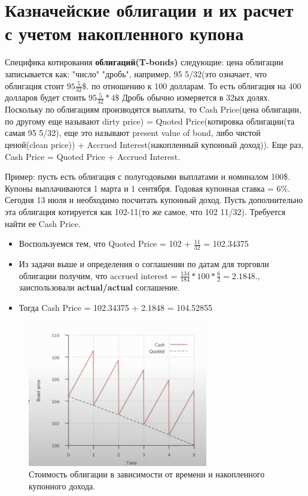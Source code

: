 \documentclass{article}
\begin{document}
\section{Казначейские облигации и их расчет с учетом накопленного купона}
Специфика котирования \textbf{облигаций(T-bonds)} следующие: цена облигации записывается как: "число" "дробь", например, 95 5/32(это означает, что облигация стоит $95\frac{5}{32}\$.$ по отношению к 100 долларам. То есть облигация на 400 долларов будет стоить $95\frac{5}{32}*4 \$$ Дробь обычно измеряется в 32ых долях.
Поскольку по облигациям производятся выплаты, то Cash Price(цена облигации, по другому еще называют dirty price) = Quoted Price(котировка облигации(та самая 95 5/32), еще это называют present value of bond, либо чистой ценой(clean price)) + Accrued Interest(накопленный купонный доход)).
Еще раз, Cash Price = Quoted Price + Accrued Interest.


Пример:  пусть есть облигация с полугодовыми выплатами и номиналом 100\$. Купоны выплачиваются 1 марта и 1 сентября. Годовая купонная ставка = 6\%. Сегодня 13 июля и необходимо посчитать купонный доход. Пусть дополнительно эта облигация котируется как 102-11(то же самое, что 102 11/32). Требуется найти ее Cash Price.

\begin{itemize}
    \item Воспользуемся тем, что Quoted Price = 102 + $\frac{11}{32}$ = 102.34375
    \item Из задачи выше и определения о соглашении по датам для торговли облигации получим, что accrued interest = $\frac{134}{184}*100*\frac{6}{2} = 2.1848.$, заиспользовали \textbf{actual/actual} соглашение.
    \item Тогда Cash Price = 102.34375 + 2.1848 = 104.52855
\end{itemize}

\begin{figure}[h]
\centering
\includegraphics[width=0.7\textwidth]{acc_int_bond.png}
\caption{Стоимость облигации в зависимости от времени и накопленного купонного дохода.}
\label{loadings}
\end{figure}
\end{document}
